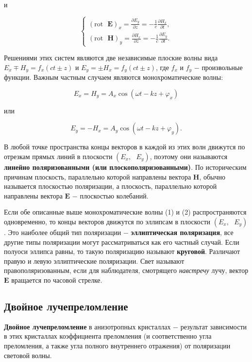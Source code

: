 \documentclass[a4paper,12pt]{article} %
\begin{document}
\hfill \break и

$$
\begin{cases}
(\text{rot} \text{ } \textbf{E})_{x} = \frac {\partial E_{y}} {\partial z} = - \frac{1}{c} \frac {\partial H_{x}} {\partial t},
\\
(\text{rot} \text{ } \textbf{H})_{y} = \frac {\partial H_{x}} {\partial z} = - \frac{1}{c} \frac {\partial E_{y}} {\partial t}.
\end{cases}
$$

\hfill \break Решениями этих систем являются две независимые плоские волны вида $E_{x} \mp H_{y} = f_{x}(ct \pm z)$ и $E_{y} = \pm H_{x} = f_{y}(ct \pm z)$, где $f_{x}$ и $f_{y}$ $-$ произвольные функции. Важным частным случаем являются монохроматические волны:

\begin{equation}\label{ linkname }
E_{x} = H_{y} = A_{x} \cos{ (\omega t - kz + \varphi_{x} ) }
\end{equation}

\hfill \break или

\begin{equation}\label{ linkname }
E_{y} = - H_{x} = A_{y} \cos { (\omega t - kz + \varphi_{y})}.
\end{equation}

\hfill \break В любой точке пространства концы векторов в каждой из этих волн движутся по отрезкам прямых линий в плоскости $(E_{x}, \text{ } E_{y})$, поэтому они называются \textbf{линейно поляризованными (или плоскополяризованными)}. По историческим причинам плоскость, параллельно которой направлены вектора $\textbf{H}$, обычно называется плоскостью поляризации, а плоскость, параллельно которой направлены вектора $\textbf{E}$ $-$ плоскостью колебаний.

\hfill \break Если обе описанные выше монохроматические волны (1) и (2) распространяются одновременно, то концы векторов движутся по эллипсам в плоскости $(E_{x}, \text{ } E_{y})$. Это наиболее общий тип поляризации $-$ \textbf{эллиптическая поляризация}, все другие типы поляризации могут рассматриваться как его частный случай. Если полуоси эллипса равны, то такую поляризацию называют \textbf{круговой}. Различают правую и левую эллиптические поляризации. Свет называют правополяризованным, если для наблюдателя, смотрящего \textit{навстречу} лучу, вектор $\textbf{E}$ вращается по часовой стрелке. 

\subsection{Двойное лучепреломление}
\hfill \break \textbf{Двойное лучепреломление} в анизотропных кристаллах $-$ результат зависимости в этих кристаллах коэффициента преломления (и соответственно угла преломления, а также угла полного внутреннего отражения) от поляризации световой волны. 
\end{document}
